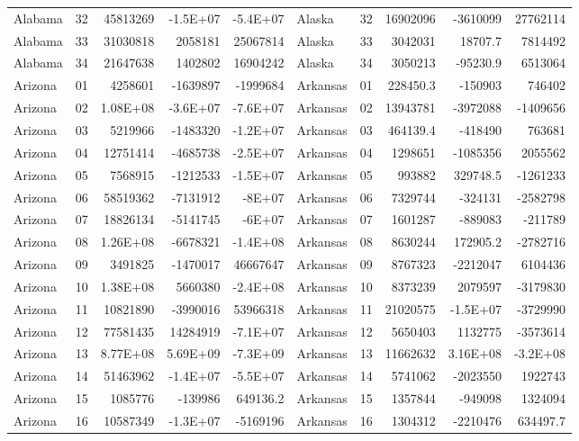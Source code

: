 \begin{landscape}
\begin{singlespace}
\begin{longtable}{lrrrr|lrrrr}
		Alabama &  32 & 45813269 & -1.5E+07 & -5.4E+07 & Alaska &  32 & 16902096 & -3610099 & 27762114 \\
		Alabama &  33 & 31030818 & 2058181 & 25067814 & Alaska &  33 & 3042031 & 18707.7 & 7814492 \\
		Alabama &  34 & 21647638 & 1402802 & 16904242 & Alaska &  34 & 3050213 & -95230.9 & 6513064\\
\hline
		Arizona &  01  & 4258601 & -1639897 & -1999684 & Arkansas &  01  & 228450.3 & -150903 & 746402 \\
		Arizona &  02  & 1.08E+08 & -3.6E+07 & -7.6E+07 & Arkansas &  02  & 13943781 & -3972088 & -1409656 \\
		Arizona &  03  & 5219966 & -1483320 & -1.2E+07 & Arkansas &  03  & 464139.4 & -418490 & 763681 \\
		Arizona &  04  & 12751414 & -4685738 & -2.5E+07 & Arkansas &  04  & 1298651 & -1085356 & 2055562 \\
		Arizona &  05  & 7568915 & -1212533 & -1.5E+07 & Arkansas &  05  & 993882 & 329748.5 & -1261233 \\
		Arizona &  06  & 58519362 & -7131912 & -8E+07 & Arkansas &  06  & 7329744 & -324131 & -2582798 \\
		Arizona &  07  & 18826134 & -5141745 & -6E+07 & Arkansas &  07  & 1601287 & -889083 & -211789 \\
		Arizona &  08  & 1.26E+08 & -6678321 & -1.4E+08 & Arkansas &  08  & 8630244 & 172905.2 & -2782716 \\
		Arizona &  09  & 3491825 & -1470017 & 46667647 & Arkansas &  09  & 8767323 & -2212047 & 6104436 \\
		Arizona &  10 & 1.38E+08 & 5660380 & -2.4E+08 & Arkansas &  10 & 8373239 & 2079597 & -3179830 \\
		Arizona &  11 & 10821890 & -3990016 & 53966318 & Arkansas &  11 & 21020575 & -1.5E+07 & -3729990 \\
		Arizona &  12 & 77581435 & 14284919 & -7.1E+07 & Arkansas &  12 & 5650403 & 1132775 & -3573614 \\
		Arizona &  13 & 8.77E+08 & 5.69E+09 & -7.3E+09 & Arkansas &  13 & 11662632 & 3.16E+08 & -3.2E+08 \\
		Arizona &  14 & 51463962 & -1.4E+07 & -5.5E+07 & Arkansas &  14 & 5741062 & -2023550 & 1922743 \\
		Arizona &  15 & 1085776 & -139986 & 649136.2 & Arkansas &  15 & 1357844 & -949098 & 1324094 \\
		Arizona &  16 & 10587349 & -1.3E+07 & -5169196 & Arkansas &  16 & 1304312 & -2210476 & 634497.7 \\

\end{longtable}
\end{singlespace}
\end{landscape}
